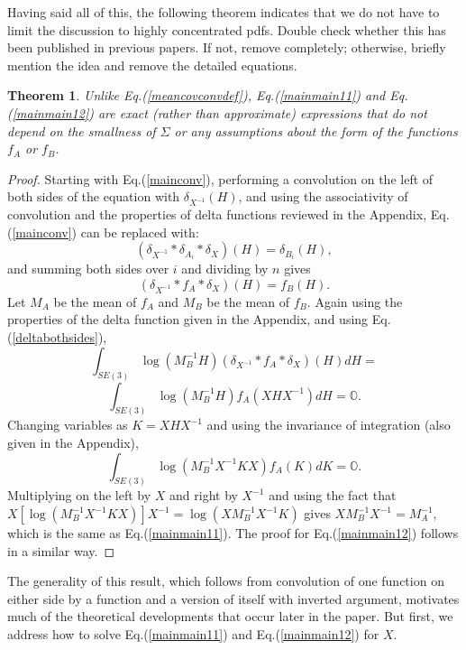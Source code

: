 \documentclass[twocolumn,10pt]{asme2ej}
\newtheorem{theorem}{Theorem}[section]
\begin{document}
Having said all of this, the following theorem indicates that we do not have to limit the discussion to highly concentrated pdfs.
{\color{red} Double check whether this has been published in previous papers. If not, remove completely; otherwise, briefly mention the idea and remove the detailed equations.}
\begin{theorem} \label{exactthm}
Unlike Eq.(\ref{meancovconvdef}), Eq.(\ref{mainmain11}) and Eq.(\ref{mainmain12}) are exact (rather than approximate) 
expressions that do not depend on the smallness of $\Sigma$ or any assumptions about the form of
the functions $f_A$ or $f_B$. 
\end{theorem}

\begin{proof}
Starting with Eq.(\ref{mainconv}), performing a convolution on the left of both sides of the equation with
$\delta_{X^{-1}}(H)$, and using the associativity of convolution and the properties of delta functions reviewed
in the Appendix, Eq.(\ref{mainconv}) can be replaced with:
$$ (\delta_{X^{-1}} * \delta_{A_i} * \delta_X)(H) = \delta_{B_i}(H), $$
and summing both sides over $i$ and dividing by $n$ gives 
\begin{equation} (\delta_{X^{-1}} * f_A * \delta_X)(H) = f_B(H). \label{deltabothsides} \end{equation}
Let $M_A$ be the mean of $f_A$ and $M_B$ be the mean of $f_B$. 
Again using the properties of the delta function given in the Appendix, and using Eq.(\ref{deltabothsides}), 
$$ \int_{SE(3)} \log({M}_{B}^{-1} H) (\delta_{X^{-1}} * f_A * \delta_{X})(H) dH = $$
$$ \int_{SE(3)} \log({M}_{B}^{-1} H) f_A({X} H {X}^{-1}) dH = \mathbb{O}. $$
Changing variables as $K = {X} H {X}^{-1}$ and using the invariance of integration (also given in the Appendix),
$$ \int_{SE(3)} \log({M}_{B}^{-1} X^{-1} K X) f_A(K) dK = \mathbb{O}. $$
Multiplying on the left by $X$ and right by $X^{-1}$ and using the fact that
$X[\log({M}_{B}^{-1} X^{-1} K X)]X^{-1} = \log(X {M}_{B}^{-1} X^{-1} K)$ gives
$X {M}_{B}^{-1} X^{-1} = M_{A}^{-1}$, which is the same as Eq.(\ref{mainmain11}). The proof for Eq.(\ref{mainmain12}) follows in a similar way.
\end{proof}

The generality of this result, which follows from convolution of one function on either side by a function and a version of itself with inverted argument,
motivates much of the theoretical developments that occur later in the paper. But first, we address how to solve Eq.(\ref{mainmain11}) and Eq.(\ref{mainmain12}) 
for $X$. 
\end{document}
